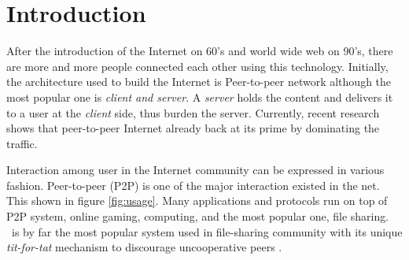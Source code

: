 \chapter{Introduction}
\label{chp:introduction}
After the introduction of the Internet on 60's and world wide web on 90's, there are more and more people connected each other using this technology. Initially, the architecture used to build the Internet is Peer-to-peer network although the most popular one is \textit{client and server}. A \textit{server} holds the content and delivers it to a user at the \textit{client} side, thus burden the server. Currently, recent research shows that peer-to-peer Internet already back at its prime by dominating the traffic\cite{2015:internettraffic:sandvine}.

Interaction among user in the Internet community can be expressed in various fashion. Peer-to-peer (P2P) is one of the major interaction existed in the net. This shown in figure \ref{fig:usage}. Many applications and protocols run on top of P2P system, online gaming, computing, and the most popular one, file sharing. \bt~is by far the most popular system used in file-sharing community with its unique \textit{tit-for-tat} mechanism to discourage uncooperative peers \cite{2003:bittorrent:cohen}. 

